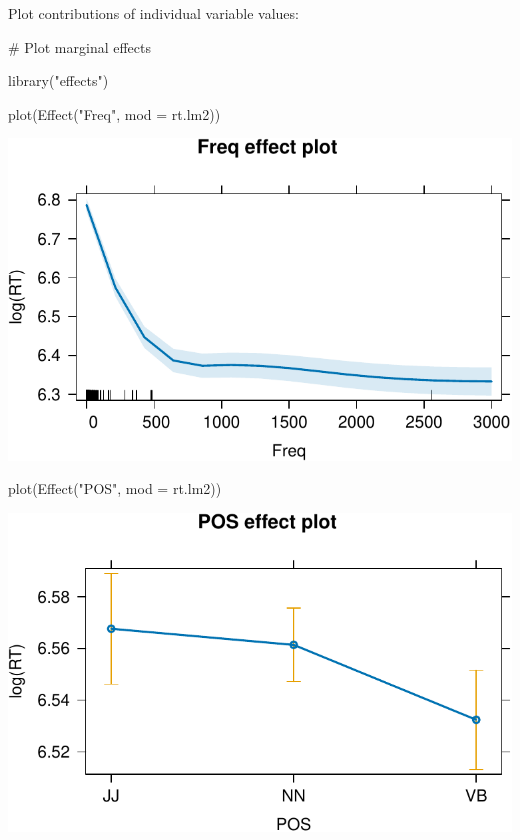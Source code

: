 \documentclass[
  11pt,
  letterpaper,
  DIV=11,
  numbers=noendperiod]{scrreprt}
\newenvironment{Shaded}{\begin{snugshade}}{\end{snugshade}}
\newcommand{\AttributeTok}[1]{\textcolor[rgb]{0.40,0.45,0.13}{#1}}
\newcommand{\CommentTok}[1]{\textcolor[rgb]{0.37,0.37,0.37}{#1}}
\newcommand{\FunctionTok}[1]{\textcolor[rgb]{0.28,0.35,0.67}{#1}}
\newcommand{\NormalTok}[1]{\textcolor[rgb]{0.00,0.23,0.31}{#1}}
\newcommand{\StringTok}[1]{\textcolor[rgb]{0.13,0.47,0.30}{#1}}
\begin{document}
Plot contributions of individual variable values:

\begin{Shaded}
\begin{Highlighting}[]
\CommentTok{\# Plot marginal effects}

\FunctionTok{library}\NormalTok{(}\StringTok{"effects"}\NormalTok{)}

\FunctionTok{plot}\NormalTok{(}\FunctionTok{Effect}\NormalTok{(}\StringTok{"Freq"}\NormalTok{, }\AttributeTok{mod =}\NormalTok{ rt.lm2))}
\end{Highlighting}
\end{Shaded}

\includegraphics{Linear_regression_files/figure-pdf/unnamed-chunk-12-1.pdf}

\begin{Shaded}
\begin{Highlighting}[]
\FunctionTok{plot}\NormalTok{(}\FunctionTok{Effect}\NormalTok{(}\StringTok{"POS"}\NormalTok{, }\AttributeTok{mod =}\NormalTok{ rt.lm2))}
\end{Highlighting}
\end{Shaded}

\includegraphics{Linear_regression_files/figure-pdf/unnamed-chunk-12-2.pdf}
\end{document}
